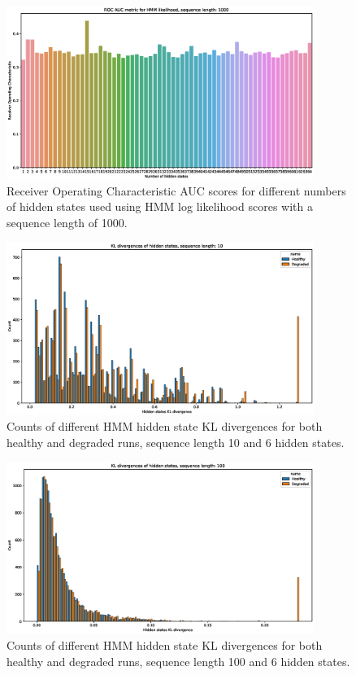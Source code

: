 \documentclass[journal]{IEEEtran}
\begin{document}
\begin{figure}[h]
 \centering
 \includegraphics[width=10cm,keepaspectratio=true]{./roc_hmm_score_1000.eps}
 \caption{Receiver Operating Characteristic AUC scores for different numbers of hidden states used using HMM log likelihood scores with a sequence length of 1000.}
 \label{figure:roc_log_likelihoods_1000}
\end{figure}

\begin{figure}[h]
 \centering
 \includegraphics[width=10cm,keepaspectratio=true]{./kl_histograms_10.eps}
 \caption{Counts of different HMM hidden state KL divergences for both healthy and degraded runs, sequence length 10 and 6 hidden states.}
 \label{figure:kl_10}
\end{figure}

\begin{figure}[h]
 \centering
 \includegraphics[width=10cm,keepaspectratio=true]{./kl_histograms_100.eps}
 \caption{Counts of different HMM hidden state KL divergences for both healthy and degraded runs, sequence length 100 and 6 hidden states.}
 \label{figure:kl_100}
\end{figure}
\end{document}
